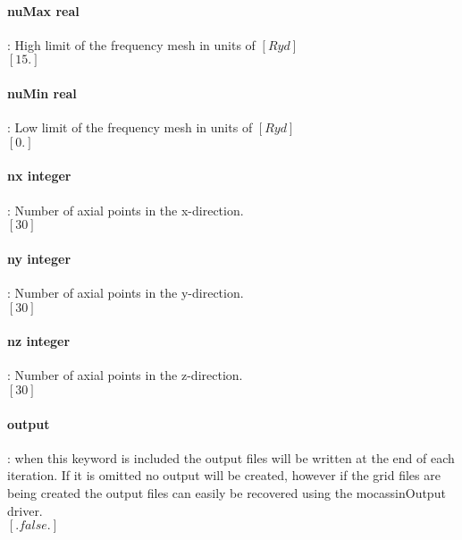 \documentclass[11pt]{article}
\begin{document}
\paragraph   { nuMax real  }    : High limit of the frequency mesh in units of $[Ryd]$\\
		     $[15.]$\\

\paragraph   { nuMin real }     : Low limit of the frequency mesh in units of $[Ryd]$\\
		     $[0.]$\\

\paragraph   { nx integer }     : Number of axial points in the x-direction.\\
		     $[30]$\\

\paragraph  {  ny integer}      : Number of axial points in the y-direction.\\
		     $[30]$\\

\paragraph  {  nz integer  }    : Number of axial points in the z-direction.\\
		     $[30]$\\

\paragraph  {  output  }        : when this keyword is included the output files will be written
                    at the end of each iteration. If it is omitted no output will be 
		    created, however if the grid files are being created the output 
                    files can easily be recovered using the mocassinOutput driver. \\
                    $[.false.]$\\
		    
\end{document}
